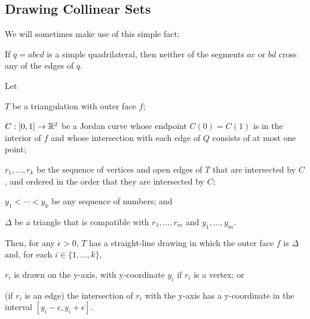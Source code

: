 \documentclass{patmorin}
\begin{document}
\subsection{Drawing Collinear Sets}


We will sometimes make use of this simple fact:
\begin{obs}
  If $q=abcd$ is a simple quadrilateral, then neither of the segments $ac$
  or $bd$ cross any of the edges of $q$.
\end{obs}

\begin{thm}
   Let
   \begin{compactenum}
     \item  $T$ be a triangulation with outer face $f$;
     \item  $C:[0,1]\to\mathbb{R}^2$ be a Jordan curve whose endpoint $C(0)=C(1)$
            is in the interior of $f$ and whose intersection with each
            edge of $Q$ consists of at most one point;
     \item $r_1,\ldots,r_k$ be the sequence of vertices and open edges
           of $T$ that are intersected by $C$, and ordered in the order
           that they are intersected by $C$;
     \item $y_1<\cdots<y_k$ be any sequence of numbers; and
     \item $\Delta$ be a triangle that is compatible with 
           $r_1,\ldots,r_m$ and $y_1,\ldots,y_m$.
  \end{compactenum}
   Then, for any $\epsilon>0$, $T$ has a
   straight-line drawing in which the outer face $f$ is $\Delta$
   and, for each $i\in\{1,\ldots,k\}$, 
   \begin{compactenum}
       \item $r_i$ is drawn on the y-axis, with y-coordinate $y_i$
         if $r_i$ is a vertex; or
       \item (if $r_i$ is an edge) the intersection of $r_i$ with the
         y-axis has a y-coordinate in the interval
         $[y_i-\epsilon,y_i+\epsilon]$.
   \end{compactenum}
\end{thm}
\end{document}
